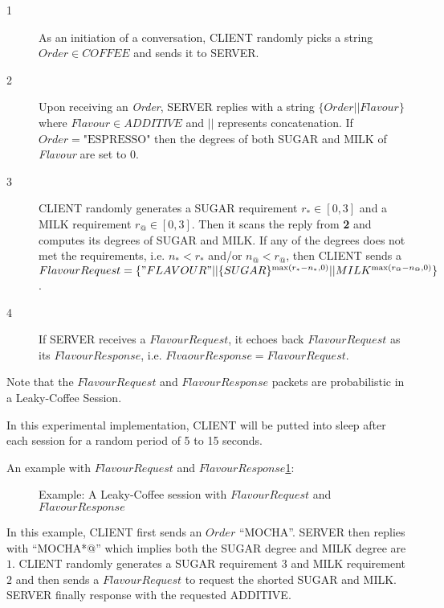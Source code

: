 \begin{description}
\item[1] As an initiation of a conversation, CLIENT randomly picks a string $Order \in COFFEE$ and sends it to SERVER.

\item[2] Upon receiving an \textit{Order}, SERVER replies with a string $\{Order || Flavour\}$ where $Flavour \in ADDITIVE$ and $||$ represents concatenation. If $Order = \text{"ESPRESSO"}$ then the degrees of both SUGAR and MILK of \textit{Flavour} are set to $0$.

\item[3] CLIENT randomly generates a SUGAR requirement $r_* \in [0, 3]$ and a MILK requirement $r_@ \in [0,3]$. Then it scans the reply from \textbf{2} and computes its degrees of SUGAR and MILK. If any of the degrees does not  met the requirements, i.e. $n_* < r_*$ and/or $n_@ < r_@$, then CLIENT sends a $ FlavourRequest = \{"FLAVOUR"||\{SUGAR\}^{\max({r_* - n_*,0})} || MILK^{\max(r_@ -  n_@, 0)} \} $.

\item[4] If SERVER receives a $FlavourRequest$, it echoes back $FlavourRequest$ as its $FlavourResponse$, i.e. $FlvaourResponse = FlavourRequest$.	
\end{description}

Note that the $FlavourRequest$ and $FlavourResponse$ packets are probabilistic in a Leaky-Coffee Session.

In this experimental implementation, CLIENT will be putted into sleep after each session for a random period of 5 to 15 seconds.

\begin{example}
An example with $FlavourRequest$ and $FlavourResponse$\ref{Fig: Leaky-Coffee Example1}:

\begin{figure}[H] \label{Fig: Leaky-Coffee Example1}
\caption{Example: A Leaky-Coffee session with $FlavourRequest$ and $FlavourResponse$}
\centering
\resizebox{6cm}{!}
{}
\end{figure}

In this example, CLIENT first sends an $Order$ “MOCHA”. SERVER then replies with “MOCHA*@” which implies both the SUGAR degree and MILK degree are $1$. CLIENT randomly generates a SUGAR requirement $3$ and MILK requirement $2$ and then sends a $FlavourRequest$ to request the shorted SUGAR and MILK. SERVER finally response with the requested ADDITIVE.
\end{example}

